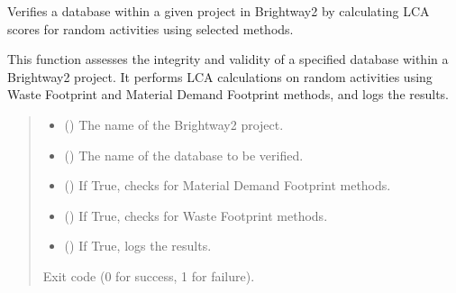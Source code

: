 \documentclass[letterpaper,10pt,english]{sphinxmanual}
\begin{document}
\begin{fulllineitems}
\label{\detokenize{WasteAndMaterialFootprint:WasteAndMaterialFootprint.VerifyDatabase.VerifyDatabase}}
\pysigstartsignatures
{}
\pysigstopsignatures
\sphinxAtStartPar
Verifies a database within a given project in Brightway2 by calculating LCA scores
for random activities using selected methods.

\sphinxAtStartPar
This function assesses the integrity and validity of a specified database within a Brightway2 project.
It performs LCA calculations on random activities using Waste Footprint and Material Demand Footprint methods,
and logs the results.
\begin{quote}\begin{description}
\begin{itemize}
\item {} 
\sphinxAtStartPar
{} () \textendash{} The name of the Brightway2 project.

\item {} 
\sphinxAtStartPar
{} () \textendash{} The name of the database to be verified.

\item {} 
\sphinxAtStartPar
{} () \textendash{} If True, checks for Material Demand Footprint methods.

\item {} 
\sphinxAtStartPar
{} () \textendash{} If True, checks for Waste Footprint methods.

\item {} 
\sphinxAtStartPar
{} () \textendash{} If True, logs the results.

\end{itemize}

\sphinxAtStartPar
Exit code (0 for success, 1 for failure).

\end{description}\end{quote}

\end{fulllineitems}
\end{document}
